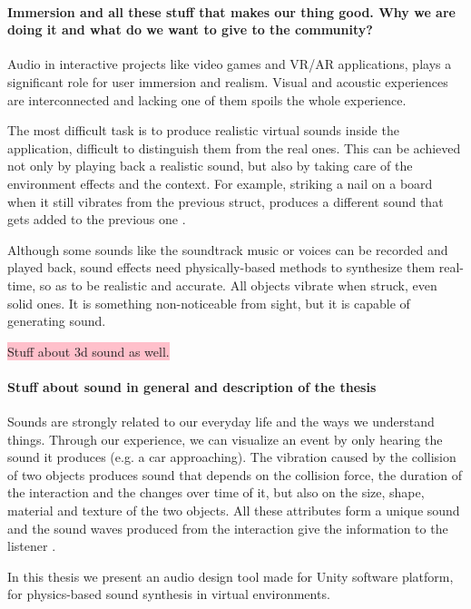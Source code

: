 \paragraph{Immersion and all these stuff that makes our thing good. Why we are doing it and what do we want to give to the community?\\}

Audio in interactive projects like video games and VR/AR applications, plays a significant role for user immersion and realism. Visual and acoustic experiences are interconnected and lacking one of them spoils the whole experience. 

The most difficult task is to produce realistic virtual sounds inside the application, difficult to distinguish them from the real ones. This can be achieved not only by playing back a realistic sound, but also by taking care of the environment effects and the context. For example, striking a nail on a board when it still vibrates from the previous struct, produces a different sound that gets added to the previous one \cite{Cook:2002:RSS:515316}.

Although some sounds like the soundtrack music or voices can be recorded and played back, sound effects need physically-based methods to synthesize them real-time, so as to be realistic and accurate. All objects vibrate when struck, even solid ones. It is something non-noticeable from sight, but it is capable of generating sound.  

\colorbox{pink}{Stuff about 3d sound as well.}

\paragraph{Stuff about sound in general and description of the thesis\\}

Sounds are strongly related to our everyday life and the ways we understand things. Through our experience, we can visualize an event by only hearing the sound it produces (e.g. a car approaching). The vibration caused by the collision of two objects produces sound that depends on the collision force, the duration of the interaction  and the changes over time of it, but also on the size, shape, material and texture of the two objects. All these attributes form a unique sound and the sound waves produced from the interaction give the information to the listener \cite{gaver1993world}.

In this thesis we present an audio design tool made for Unity\textsuperscript{\textregistered} software platform, for physics-based sound synthesis in virtual environments. \\

